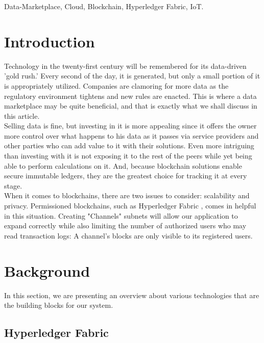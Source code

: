 \documentclass[conference]{IEEEtran}
\begin{document}
\begin{IEEEkeywords}
Data-Marketplace, Cloud, Blockchain, Hyperledger Fabric, IoT.
\end{IEEEkeywords}


\section{Introduction}
Technology in the twenty-first century will be remembered for its data-driven 'gold rush.' Every second of the day, it is generated, but only a small portion of it is appropriately utilized. Companies are clamoring for more data as the regulatory environment tightens and new rules are enacted\cite{voigt2017eu}. This is where a data marketplace may be quite beneficial, and that is exactly what we shall discuss in this article.\\
Selling data is fine, but investing in it is more appealing since it offers the owner more control over what happens to his data as it passes via service providers and other parties who can add value to it with their solutions. Even more intriguing than investing with it is not exposing it to the rest of the peers while yet being able to perform calculations on it. And, because blockchain \cite{di2017blockchain} solutions enable secure immutable ledgers, they are the greatest choice for tracking it at every stage.\\
When it comes to blockchains, there are two issues to consider: scalability and privacy. Permissioned blockchains, such as Hyperledger Fabric \cite{androulaki2018hyperledger}, comes in helpful in this situation. Creating "Channels" subnets will allow our application to expand correctly while also limiting the number of authorized users who may read transaction logs: A channel's blocks are only visible to its registered users.
\section{Background}
In this section, we are presenting an overview about various technologies that are the building blocks for our system.
\subsection{Hyperledger Fabric}
\end{document}
